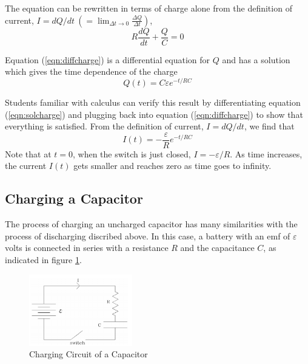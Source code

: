 The equation can be rewritten in terms of charge alone from the definition of current, $\displaystyle I = dQ/dt \ \left(=\lim_{\Delta t\to 0} \frac{\Delta Q}{\Delta t}\right)$,
\begin{equation}
    R\frac{dQ}{dt} + \frac{Q}{C} = 0
    \label{eqn:diffcharge}
\end{equation}

Equation (\ref{eqn:diffcharge}) is a differential equation for $Q$ and has a solution which gives the time dependence of the charge
\begin{equation}
    Q(t) = C\varepsilon e^{-t/RC}
    \label{eqn:solcharge}
\end{equation}

Students familiar with calculus can verify this result by differentiating equation (\ref{eqn:solcharge}) and plugging back into equation (\ref{eqn:diffcharge}) to show that everything is satisfied. From the definition of current, $I = dQ/dt$, we find that
\begin{equation}
    I(t) = -\frac{\varepsilon}{R}e^{-t/RC}
    \label{eqn:dischargecurrent}
\end{equation}
Note that at $t=0$, when the switch is just closed, $I = -\varepsilon/R$. As time increases, the current $I(t)$ gets smaller and reaches zero as time goes to infinity.

\subsection{Charging a Capacitor}

The process of charging an uncharged capacitor has many similarities with the process of discharging discribed above. In this case, a battery with an emf of $\varepsilon$ volts is connected in series with a resistance $R$ and the capacitance $C$, as indicated in figure \ref{fig:chargecircuit}.

\begin{figure}[h]
    \begin{center}
        \includegraphics[width=0.4\textwidth]{./Exp4/pic/image3.png}
    \end{center}
    \caption{Charging Circuit of a Capacitor}
    \label{fig:chargecircuit}
\end{figure}

